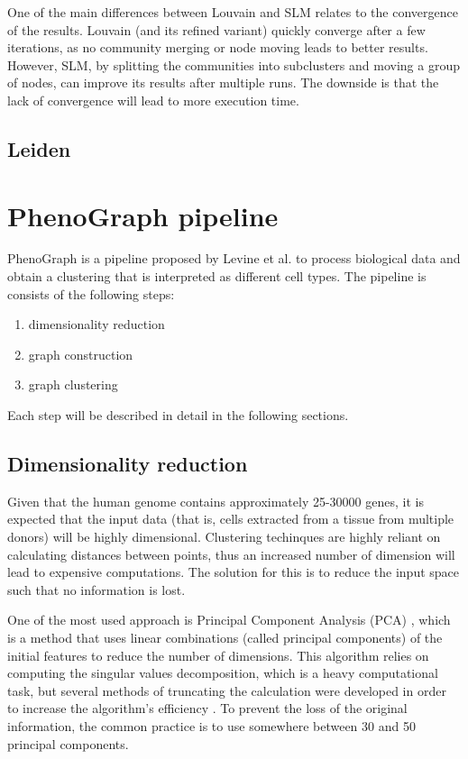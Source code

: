 One of the main differences between Louvain and SLM relates to the convergence of the results. Louvain (and its refined variant) quickly converge after a few iterations, as no community merging or node moving leads to better results. However, SLM, by splitting the communities into subclusters and moving a group of nodes, can improve its results after multiple runs. The downside is that the lack of convergence will lead to more execution time.

\subsection{Leiden}

\section{PhenoGraph pipeline}
    PhenoGraph \cite{Levine2015} is a pipeline proposed by Levine et al. to process biological data and obtain a clustering that is interpreted as different cell types. The pipeline is consists of the following steps:
    \begin{enumerate}
        \item dimensionality reduction
        \item graph construction
        \item graph clustering
    \end{enumerate}

    Each step will be described in detail in the following sections.

    \subsection{Dimensionality reduction}
    Given that the human genome contains approximately 25-30000 genes, it is expected that the input data (that is, cells extracted from a tissue from multiple donors) will be highly dimensional. Clustering techinques are highly reliant on calculating distances between points, thus an increased number of dimension will lead to expensive computations. The solution for this is to reduce the input space such that no information is lost.
    
    One of the most used approach is Principal Component Analysis (PCA) \cite{WOLD198737}, which is a method that uses linear combinations (called principal components) of the initial features to reduce the number of dimensions. This algorithm relies on computing the singular values decomposition, which is a heavy computational task, but several methods of truncating the calculation were developed in order to increase the algorithm's efficiency \cite{Baglama2016IRLBAFP}. To prevent the loss of the original information, the common practice is to use somewhere between 30 and 50 principal components.

